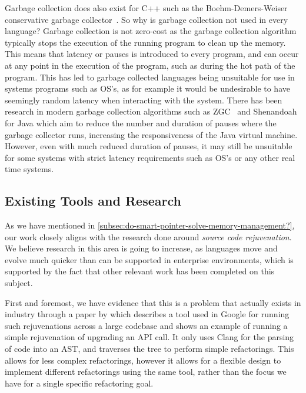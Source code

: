 \documentclass{proposal}
\begin{document}
    Garbage collection does also exist for C++ such as the Boehm-Demers-Weiser conservative garbage collector~\cite{Boehm2002}.
    So why is garbage collection not used in every language?
    Garbage collection is not zero-cost as the garbage collection algorithm typically stops the execution of the running program to clean up the memory.
    This means that latency or pauses is introduced to every program, and can occur at any point in the execution of the program, such as during the hot path of the program.
    This has led to garbage collected languages being unsuitable for use in systems programs such as OS's, as for example it would be undesirable to have seemingly random latency when interacting with the system.
    There has been research in modern garbage collection algorithms such as ZGC~\cite{Liden2018} and Shenandoah~\cite{Flood2016} for Java which aim to reduce the number and duration of pauses where the garbage collector runs, increasing the responsiveness of the Java virtual machine.
    However, even with much reduced duration of pauses, it may still be unsuitable for some systems with strict latency requirements such as OS's or any other real time systems.

    \subsection{Existing Tools and Research}\label{subsec:existing-tools-and-research}

    As we have mentioned in \autoref{subsec:do-smart-pointer-solve-memory-management?}, our work closely aligns with the research done around \emph{source code rejuvenation}.
    We believe research in this area is going to increase, as languages move and evolve much quicker than can be supported in enterprise environments, which is supported by the fact that other relevant work has been completed on this subject.

    First and foremost, we have evidence that this is a problem that actually exists in industry through a paper by \citet{Wright2013} which describes a tool used in Google for running such rejuvenations across a large codebase and shows an example of running a simple rejuvenation of upgrading an API call.
    It only uses Clang for the parsing of code into an AST, and traverses the tree to perform simple refactorings.
    This allows for less complex refactorings, however it allows for a flexible design to implement different refactorings using the same tool, rather than the focus we have for a single specific refactoring goal.
\end{document}
